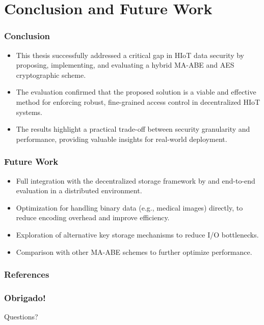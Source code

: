 \documentclass{beamer}
\begin{document}
\section{Conclusion and Future Work}

\begin{frame}
    \frametitle{Conclusion}
    \begin{itemize}
        \item This thesis successfully addressed a critical gap in HIoT data security by proposing, implementing, and evaluating a hybrid MA-ABE and AES cryptographic scheme.
        \item The evaluation confirmed that the proposed solution is a viable and effective method for enforcing robust, fine-grained access control in decentralized HIoT systems.
        \item The results highlight a practical trade-off between security granularity and performance, providing valuable insights for real-world deployment.
    \end{itemize}
\end{frame}

\begin{frame}
    \frametitle{Future Work}
    \begin{itemize}
        \item Full integration with the decentralized storage framework by  and end-to-end evaluation in a distributed environment.
        \item Optimization for handling binary data (e.g., medical images) directly, to reduce encoding overhead and improve efficiency.
        \item Exploration of alternative key storage mechanisms to reduce I/O bottlenecks.
        \item Comparison with other MA-ABE schemes to further optimize performance.
    \end{itemize}
\end{frame}

\begin{frame}[allowframebreaks]
    \frametitle{References}
    
\end{frame}

\begin{frame}
    \frametitle{Obrigado!}
    \begin{center}
        \Large Questions?
    \end{center}
    \vspace{2cm}
    \InfContacts
\end{frame}
\end{document}
